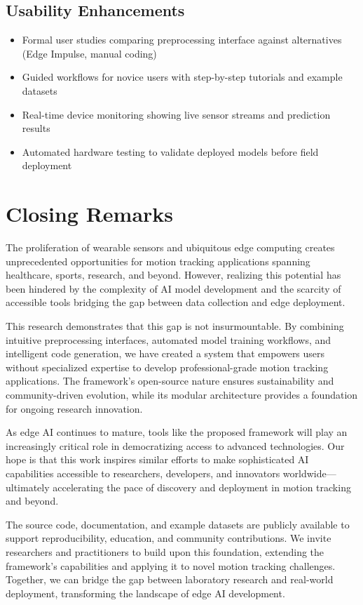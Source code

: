 \subsection{Usability Enhancements}
\begin{itemize}
    \item Formal user studies comparing preprocessing interface against alternatives (Edge Impulse, manual coding)
    \item Guided workflows for novice users with step-by-step tutorials and example datasets
    \item Real-time device monitoring showing live sensor streams and prediction results
    \item Automated hardware testing to validate deployed models before field deployment
\end{itemize}

\section{Closing Remarks}

The proliferation of wearable sensors and ubiquitous edge computing creates unprecedented opportunities for motion tracking applications spanning healthcare, sports, research, and beyond. However, realizing this potential has been hindered by the complexity of AI model development and the scarcity of accessible tools bridging the gap between data collection and edge deployment.

This research demonstrates that this gap is not insurmountable. By combining intuitive preprocessing interfaces, automated model training workflows, and intelligent code generation, we have created a system that empowers users without specialized expertise to develop professional-grade motion tracking applications. The framework's open-source nature ensures sustainability and community-driven evolution, while its modular architecture provides a foundation for ongoing research innovation.

As edge AI continues to mature, tools like the proposed framework will play an increasingly critical role in democratizing access to advanced technologies. Our hope is that this work inspires similar efforts to make sophisticated AI capabilities accessible to researchers, developers, and innovators worldwide—ultimately accelerating the pace of discovery and deployment in motion tracking and beyond.

The source code, documentation, and example datasets are publicly available to support reproducibility, education, and community contributions. We invite researchers and practitioners to build upon this foundation, extending the framework's capabilities and applying it to novel motion tracking challenges. Together, we can bridge the gap between laboratory research and real-world deployment, transforming the landscape of edge AI development.

